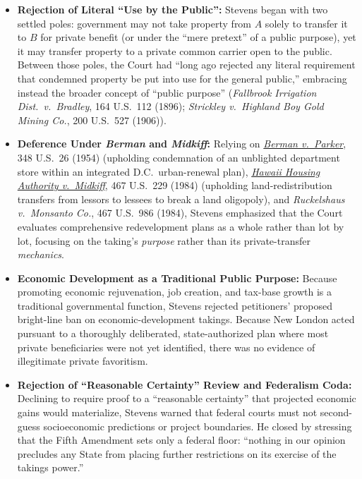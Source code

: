 \documentclass[12pt]{article}
\begin{document}
\begin{itemize}
  \item \textbf{Rejection of Literal ``Use by the Public'':} Stevens began with two settled poles: government may not take property from $A$ solely to transfer it to $B$ for private benefit (or under the ``mere pretext'' of a public purpose), yet it may transfer property to a private common carrier open to the public. Between those poles, the Court had ``long ago rejected any literal requirement that condemned property be put into use for the general public,'' embracing instead the broader concept of ``public purpose'' (\textit{Fallbrook Irrigation Dist.\ v.\ Bradley}, 164 U.S.\ 112 (1896); \textit{Strickley v.\ Highland Boy Gold Mining Co.}, 200 U.S.\ 527 (1906)).
  \item \textbf{Deference Under \textit{Berman} and \textit{Midkiff}:} Relying on \href{https://supreme.justia.com/cases/federal/us/348/26/}{\textit{Berman v.\ Parker}}, 348 U.S.\ 26 (1954) (upholding condemnation of an unblighted department store within an integrated D.C.\ urban-renewal plan), \href{https://supreme.justia.com/cases/federal/us/467/229/}{\textit{Hawaii Housing Authority v.\ Midkiff}}, 467 U.S.\ 229 (1984) (upholding land-redistribution transfers from lessors to lessees to break a land oligopoly), and \textit{Ruckelshaus v.\ Monsanto Co.}, 467 U.S.\ 986 (1984), Stevens emphasized that the Court evaluates comprehensive redevelopment plans as a whole rather than lot by lot, focusing on the taking's \textit{purpose} rather than its private-transfer \textit{mechanics}.
  \item \textbf{Economic Development as a Traditional Public Purpose:} Because promoting economic rejuvenation, job creation, and tax-base growth is a traditional governmental function, Stevens rejected petitioners' proposed bright-line ban on economic-development takings. Because New London acted pursuant to a thoroughly deliberated, state-authorized plan where most private beneficiaries were not yet identified, there was no evidence of illegitimate private favoritism.
  \item \textbf{Rejection of ``Reasonable Certainty'' Review and Federalism Coda:} Declining to require proof to a ``reasonable certainty'' that projected economic gains would materialize, Stevens warned that federal courts must not second-guess socioeconomic predictions or project boundaries. He closed by stressing that the Fifth Amendment sets only a federal floor: ``nothing in our opinion precludes any State from placing further restrictions on its exercise of the takings power.''
\end{itemize}
\end{document}
